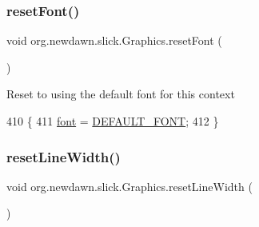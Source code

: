 \subsubsection{\texorpdfstring{reset\+Font()}{resetFont()}}
{\footnotesize\ttfamily void org.\+newdawn.\+slick.\+Graphics.\+reset\+Font (\begin{DoxyParamCaption}{ }\end{DoxyParamCaption})\hspace{0.3cm}{\ttfamily [inline]}}

Reset to using the default font for this context 
\begin{DoxyCode}
410                             \{
411         \mbox{\hyperlink{classorg_1_1newdawn_1_1slick_1_1_graphics_a3fc899a622817cc89e2c9f0111243b65}{font}} = \mbox{\hyperlink{classorg_1_1newdawn_1_1slick_1_1_graphics_a5012bdee04bc821457bcc5fdcd23c5c6}{DEFAULT\_FONT}};
412     \}
\end{DoxyCode}
\mbox{\label{classorg_1_1newdawn_1_1slick_1_1_graphics_a439e42acc146d93467fb7a981cdb7caa}} 
\subsubsection{\texorpdfstring{reset\+Line\+Width()}{resetLineWidth()}}
{\footnotesize\ttfamily void org.\+newdawn.\+slick.\+Graphics.\+reset\+Line\+Width (\begin{DoxyParamCaption}{ }\end{DoxyParamCaption})\hspace{0.3cm}{\ttfamily [inline]}}

